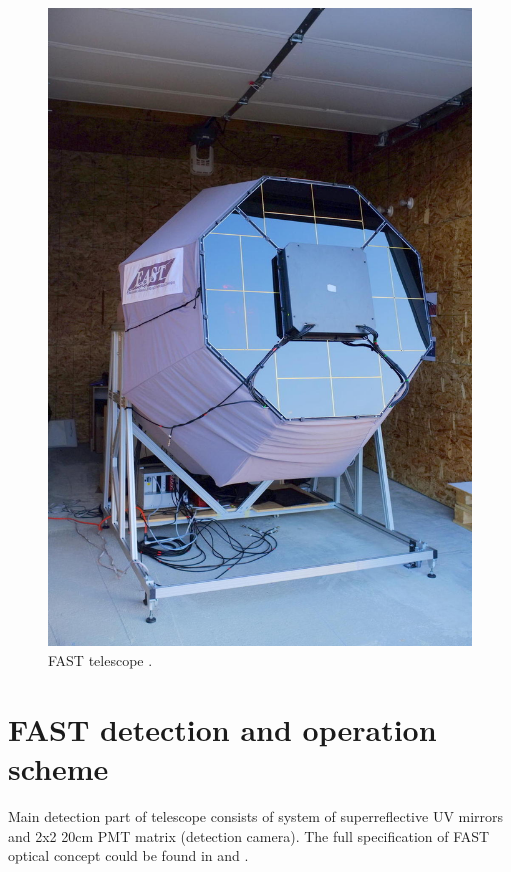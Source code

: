 \begin{figure}[H]
 \centering
 \includegraphics[scale = 0.2]{./pictures/FASTReal}
 \caption{FAST telescope \cite{Project}.}
 \label{FASThut}
 
\end{figure}
\section{FAST detection and operation scheme}
Main detection part of telescope consists of system of superreflective UV mirrors and 2x2 20cm PMT matrix (detection camera). The full specification of FAST optical concept could be found in \cite{Mandat_2017} and \cite{MALACARI2020102430}.

